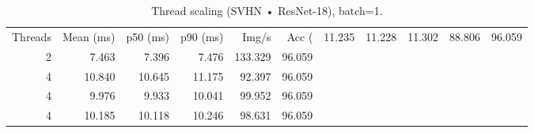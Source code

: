 \begin{table}
\caption{Thread scaling (SVHN • ResNet-18), batch=1.}
\label{tab:threads_svhn_resnet18}
\begin{tabular}{rrrrrr}
\toprule
Threads & Mean (ms) & p50 (ms) & p90 (ms) & Img/s & Acc (%
 & 11.235 & 11.228 & 11.302 & 88.806 & 96.059 \\
2 & 7.463 & 7.396 & 7.476 & 133.329 & 96.059 \\
4 & 10.840 & 10.645 & 11.175 & 92.397 & 96.059 \\
4 & 9.976 & 9.933 & 10.041 & 99.952 & 96.059 \\
4 & 10.185 & 10.118 & 10.246 & 98.631 & 96.059 \\
\bottomrule
\end{tabular}
\end{table}
